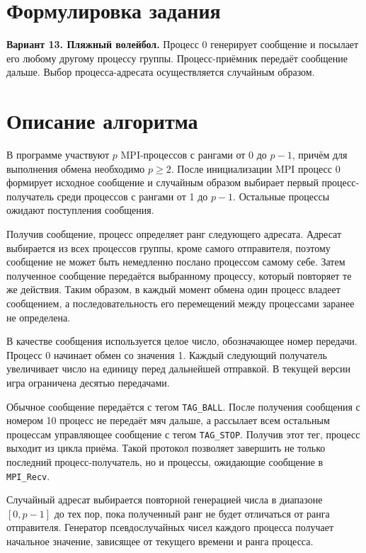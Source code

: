 \documentclass[14pt,a4paper]{extarticle}
\begin{document}
\section{Формулировка задания}

\textbf{Вариант 13. Пляжный волейбол.} Процесс 0 генерирует сообщение и
посылает его любому другому процессу группы. Процесс-приёмник передаёт
сообщение дальше. Выбор процесса-адресата осуществляется случайным образом.

\section{Описание алгоритма}

В программе участвуют $p$ MPI-процессов с рангами от 0 до $p-1$,
причём для выполнения обмена необходимо $p\geq 2$. После инициализации MPI
процесс 0 формирует исходное сообщение и случайным образом выбирает первый
процесс-получатель среди процессов с рангами от 1 до $p-1$. Остальные
процессы ожидают поступления сообщения.

Получив сообщение, процесс определяет ранг следующего адресата. Адресат
выбирается из всех процессов группы, кроме самого отправителя, поэтому
сообщение не может быть немедленно послано процессом самому себе. Затем
полученное сообщение передаётся выбранному процессу, который повторяет те же
действия. Таким образом, в каждый момент обмена один процесс владеет
сообщением, а последовательность его перемещений между процессами заранее не
определена.

В качестве сообщения используется целое число, обозначающее номер передачи.
Процесс 0 начинает обмен со значения 1. Каждый следующий получатель
увеличивает число на единицу перед дальнейшей отправкой. В текущей версии
игра ограничена десятью передачами.

Обычное сообщение передаётся с тегом \texttt{TAG\_BALL}. После получения
сообщения с номером 10 процесс не передаёт мяч дальше, а рассылает всем
остальным процессам управляющее сообщение с тегом \texttt{TAG\_STOP}.
Получив этот тег, процесс выходит из цикла приёма. Такой протокол позволяет
завершить не только последний процесс-получатель, но и процессы, ожидающие
сообщение в \texttt{MPI\_Recv}.

Случайный адресат выбирается повторной генерацией числа в диапазоне
$[0,p-1]$ до тех пор, пока полученный ранг не будет отличаться от ранга
отправителя. Генератор псевдослучайных чисел каждого процесса получает
начальное значение, зависящее от текущего времени и ранга процесса.
\end{document}
